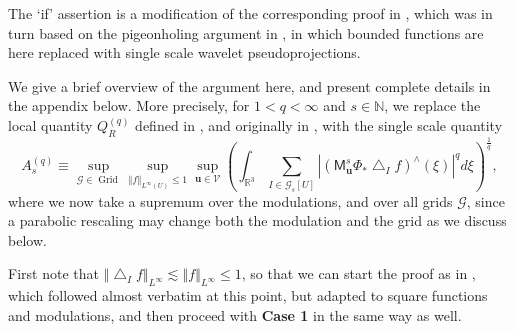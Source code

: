 \documentclass{amsart}%
\theoremstyle{plain}
\numberwithin{equation}{section}
\begin{document}
The `if' assertion is a modification of the corresponding proof in \cite[proof
of Theorem 3]{RiSa}, which was in turn based on the pigeonholing argument in
\cite[Section 2]{BoGu}, in which bounded functions are here replaced with
single scale wavelet pseudoprojections.

We give a brief overview of the argument here, and present complete details in
the appendix below. More precisely, for $1<q<\infty$ and $s\in\mathbb{N} $, we
replace the local quantity $Q_{R}^{\left(  q\right)  }$ defined in \cite[proof
of Theorem 3]{RiSa}, and originally in \cite[Section 2]{BoGu}, with the single
scale quantity
\[
A_{s}^{\left(  q\right)  }\equiv\sup_{\mathcal{G}\in\operatorname*{Grid}}%
\sup_{\left\Vert f\right\Vert _{L^{\infty}\left(  U\right)  }\leq1}%
\sup_{\mathbf{u}\in\mathcal{V}}\left(  \int_{\mathbb{R}^{3}}\sum
_{I\in\mathcal{G}_{s}\left[  U\right]  }\left\vert \left(  \mathsf{M}%
_{\mathbf{u}}^{s}\Phi_{\ast}\bigtriangleup_{I}f\right)  ^{\wedge}\left(
\xi\right)  \right\vert ^{q}d\xi\right)  ^{\frac{1}{q}},
\]
where we now take a supremum over the modulations, and over all grids
$\mathcal{G}$, since a parabolic rescaling may change both the modulation and
the grid as we discuss below.

First note that $\left\Vert \bigtriangleup_{I}f\right\Vert _{L^{\infty}%
}\lesssim\left\Vert f\right\Vert _{L^{\infty}}\leq1$, so that we can start the
proof as in \cite[proof of Theorem 3]{RiSa}, which followed \cite[Section
2]{BoGu} almost verbatim at this point, but adapted to square functions and
modulations, and then proceed with \textbf{Case 1} in the same way as well.
\end{document}

